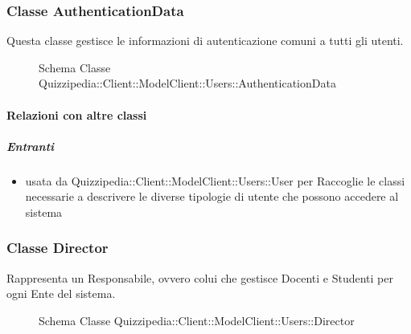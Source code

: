 \subsubsection{Classe AuthenticationData}
Questa classe gestisce le informazioni di autenticazione comuni a tutti gli utenti.
\begin{figure}[H]
\centering
\noindent{}
\caption[Schema Classe AuthenticationData]{Schema Classe Quizzipedia::Client::ModelClient::Users::AuthenticationData}
\end{figure}
\paragraph{Relazioni con altre classi}
\subparagraph{Entranti}
\begin{itemize}
\item usata da Quizzipedia::Client::ModelClient::Users::User per Raccoglie le classi necessarie a descrivere le diverse tipologie di utente che possono accedere al sistema
\end{itemize}
\subsubsection{Classe Director}
Rappresenta un Responsabile, ovvero colui che gestisce Docenti e Studenti per ogni Ente del sistema.
\begin{figure}[H]
\centering
\noindent{}
\caption[Schema Classe Director]{Schema Classe Quizzipedia::Client::ModelClient::Users::Director}
\end{figure}

